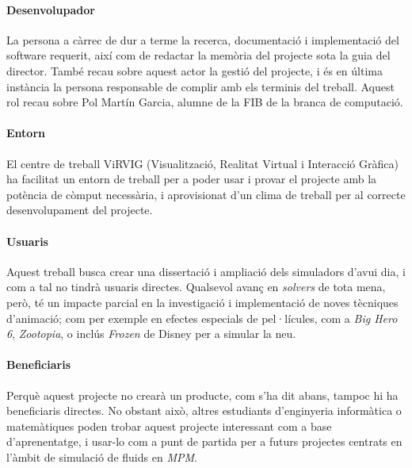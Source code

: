 \documentclass[a4paper]{report}
\begin{document}
	\paragraph{\quad Desenvolupador} La persona a càrrec de dur a terme la recerca, documentació i implementació del software requerit, així com de redactar la memòria del projecte sota la guia del director. També recau sobre aquest actor la gestió del projecte, i és en última instància la persona responsable de complir amb els terminis del treball. Aquest rol recau sobre Pol Martín Garcia, alumne de la FIB de la branca de computació.
	\paragraph{\quad Entorn} El centre de treball ViRVIG (Visualització, Realitat Virtual i Interacció Gràfica) ha facilitat un entorn de treball per a poder usar i provar el projecte amb la potència de còmput necessària, i aprovisionat d'un clima de treball per al correcte desenvolupament del projecte.
	\paragraph{\quad Usuaris} Aquest treball busca crear una dissertació i ampliació dels simuladors d'avui dia, i com a tal no tindrà usuaris directes. Qualsevol avanç en \textit{solvers} de tota mena, però, té un impacte parcial en la investigació i implementació de noves tècniques d'animació; com per exemple en efectes especials de pel·lícules, com a \textit{Big Hero 6}, \textit{Zootopia}, o inclús \textit{Frozen} de Disney \cite{Stomakhin} per a simular la neu.
	\paragraph{\quad Beneficiaris} Perquè aquest projecte no crearà un producte, com s'ha dit abans, tampoc hi ha beneficiaris directes. No obstant això, altres estudiants d'enginyeria informàtica o matemàtiques poden trobar aquest projecte interessant com a base d'aprenentatge, i usar-lo com a punt de partida per a futurs projectes centrats en l'àmbit de simulació de fluids en \textit{MPM}.
	
\end{document}
